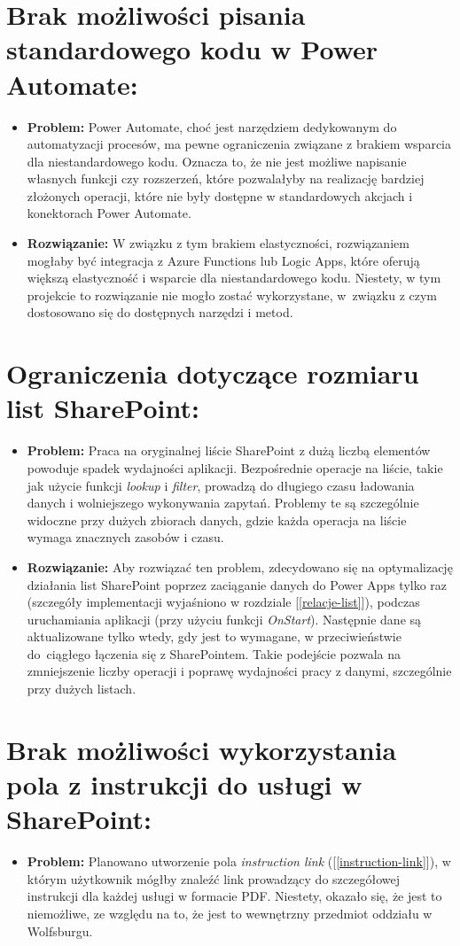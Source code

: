\section*{Brak możliwości pisania standardowego kodu w Power Automate:}
\begin{itemize}
      \item \textbf{Problem:} Power Automate, choć jest narzędziem dedykowanym do automatyzacji procesów, ma pewne ograniczenia związane z brakiem wsparcia dla niestandardowego kodu. Oznacza to, że nie jest możliwe napisanie własnych funkcji czy rozszerzeń, które pozwalałyby na realizację bardziej złożonych operacji, które nie były dostępne w standardowych akcjach i konektorach Power Automate.
      \item \textbf{Rozwiązanie:} W związku z tym brakiem elastyczności, rozwiązaniem mogłaby być integracja z Azure Functions lub Logic Apps, które oferują większą elastyczność i wsparcie dla niestandardowego kodu. Niestety, w tym projekcie to rozwiązanie nie mogło zostać wykorzystane, w~związku z czym dostosowano się do dostępnych narzędzi i metod.
\end{itemize}

\section*{Ograniczenia dotyczące rozmiaru list SharePoint:}
\begin{itemize}
      \item \textbf{Problem:} Praca na oryginalnej liście SharePoint z dużą liczbą elementów powoduje spadek wydajności aplikacji. Bezpośrednie operacje na liście, takie jak użycie funkcji \emph{lookup} i \emph{filter}, prowadzą do długiego czasu ładowania danych i wolniejszego wykonywania zapytań. Problemy te są szczególnie widoczne przy dużych zbiorach danych, gdzie każda operacja na liście wymaga znacznych zasobów i czasu.
      \item \textbf{Rozwiązanie:} Aby rozwiązać ten problem, zdecydowano się na optymalizację działania list SharePoint poprzez zaciąganie danych do Power Apps tylko raz (szczegóły implementacji wyjaśniono w rozdziale [\ref{relacje-list}]), podczas uruchamiania aplikacji (przy użyciu funkcji \emph{OnStart}). Następnie dane są aktualizowane tylko wtedy, gdy jest to wymagane, w przeciwieństwie do~ciągłego łączenia się z SharePointem. Takie podejście pozwala na zmniejszenie liczby operacji i poprawę wydajności pracy z danymi, szczególnie przy dużych listach.
\end{itemize}
\section*{Brak możliwości wykorzystania pola z instrukcji do usługi w SharePoint:}
\begin{itemize}
      \item \textbf{Problem:} Planowano utworzenie pola \emph{instruction link} ([\ref{instruction-link}]), w którym użytkownik mógłby znaleźć link prowadzący do szczegółowej instrukcji dla każdej usługi w formacie PDF. Niestety, okazało się, że jest to niemożliwe, ze względu na to, że jest to wewnętrzny przedmiot oddziału w Wolfsburgu.
\end{itemize}

